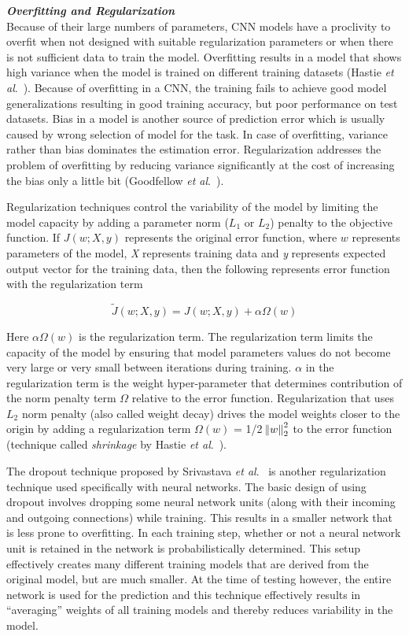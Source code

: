 \documentclass [11pt,letterpaper ,twoside ,openany ]{report}
\begin{document}
    \noindent
    \textbf{\textit{Overfitting and Regularization}}\\    
    Because of their large numbers of parameters, CNN models have a proclivity to overfit when not designed with suitable regularization parameters or when there is not sufficient data to train the model. Overfitting results in a model that shows high variance when the model is trained on different training datasets (Hastie \textit{et al}.\ \cite{hastie-et-al-2014}). Because of overfitting in a CNN, the training fails to achieve good model generalizations resulting in good training accuracy, but poor performance on test datasets. Bias in a model is another source of prediction error which is usually caused by wrong selection of model for the task. In case of overfitting, variance rather than bias dominates the estimation error. Regularization addresses the problem of overfitting by reducing variance significantly at the cost of increasing the bias only a little bit (Goodfellow \textit{et al}.\ \cite{Goodfellow-et-al-2016}). 

    Regularization techniques control the variability of the model by limiting the model capacity by adding a parameter norm (\(L_1\) or \(L_2\)) penalty to the objective function. If \(J(w; X, y) \) represents the original error function, where \(w\) represents parameters of the model, \textit{X} represents training data and \textit{y} represents expected output vector for the training data, then the following represents error function with the regularization term

    \[ \widetilde{J}(w; X, y) = J(w; X, y) + \alpha \Omega(w)   \]

    \noindent
    Here \(\alpha \Omega(w)\) is the regularization term. The regularization term limits the capacity of the model by ensuring that model parameters values do not become very large or very small between iterations during training. \(\alpha\) in the regularization term is the weight hyper-parameter that determines contribution of the norm penalty term \(\Omega\) relative to the error function. Regularization that uses \(L_2\) norm penalty (also called weight decay) drives the model weights closer to the origin by adding a regularization term \( \Omega(w)\) = 1/2 \( \norm{w}^{2}_{2}  \) to the error function (technique called \textit{shrinkage} by Hastie \textit{et al}.\ \cite{hastie-et-al-2014}). 

    The dropout technique proposed by Srivastava \textit{et al}.\ \cite{srivastava2014dropout} is another regularization technique used specifically with neural networks. The basic design of using dropout involves dropping some neural network units (along with their incoming and outgoing connections) while training. This results in a smaller network that is less prone to overfitting. In each training step, whether or not a neural network unit is retained in the network is probabilistically determined. This setup effectively creates many different training models that are derived from the original model, but are much smaller. At the time of testing however, the entire network is used for the prediction and this technique effectively results in ``averaging'' weights of all training models and thereby reduces variability in the model.
\end{document}
